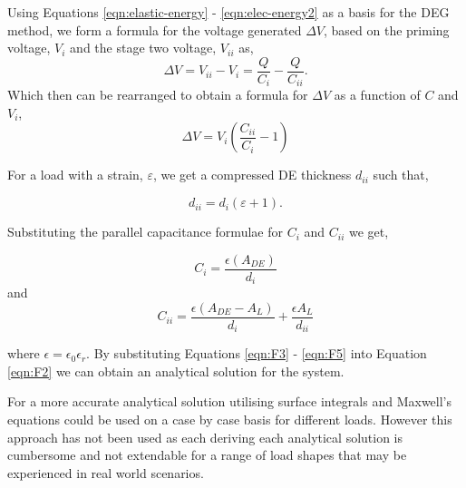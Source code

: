 Using Equations \ref{eqn:elastic-energy} - \ref{eqn:elec-energy2} as a basis for the DEG method, we form a formula for the voltage generated $\Delta V$, based on the priming voltage, $V_i$ and the stage two voltage, $V_{ii}$ as,
\begin{equation}
	\Delta V = V_{ii} - V_i = \frac{Q}{C_{i}} - \frac{Q}{C_{ii}}.
	\label{eqn:F1}
\end{equation}
Which then can be rearranged to obtain a formula for $\Delta V$ as a function of $C$ and $V_i$,
\begin{equation}
	\Delta V = V_i \left(\frac{C_{ii}}{C_i} - 1\right)
	\label{eqn:F2}
\end{equation}

For a load with a strain, $\varepsilon$, we get a compressed DE thickness $d_{ii}$ such that,

\begin{equation}
	d_{ii} = d_i(\varepsilon + 1).
	\label{eqn:F3}
\end{equation}

Substituting the parallel capacitance formulae for $C_i$ and $C_{ii}$ we get,

\begin{equation}
	C_i = \frac{\epsilon (A_{DE})}{d_i}
	\label{eqn:F4}
\end{equation}
and
\begin{equation}
	C_{ii} = \frac{\epsilon (A_{DE} - A_L)}{d_i} + \frac{\epsilon A_L}{d_{ii}}
	\label{eqn:F5}
\end{equation}

where $\epsilon = \epsilon_0\epsilon_r$. By substituting Equations \ref{eqn:F3} - \ref{eqn:F5} into Equation \ref{eqn:F2} we can obtain an analytical solution for the system. 

For a more accurate analytical solution utilising surface integrals and Maxwell's equations could be used on a case by case basis for different loads. However this approach has not been used as each deriving each analytical solution is cumbersome and not extendable for a range of load shapes that may be experienced in real world scenarios.



